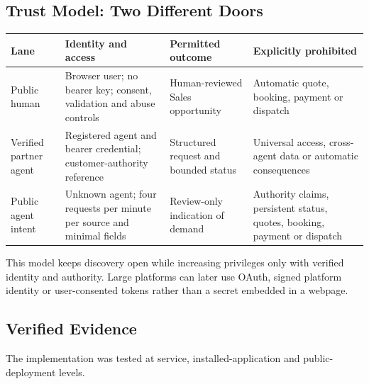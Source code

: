 \subsection{Trust Model: Two Different Doors}

\begin{center}
\begin{tabularx}{\textwidth}{>{\raggedright\arraybackslash}X >{\raggedright\arraybackslash}X >{\raggedright\arraybackslash}X >{\raggedright\arraybackslash}X}
\toprule
\textbf{Lane} & \textbf{Identity and access} & \textbf{Permitted outcome} & \textbf{Explicitly prohibited} \\
\midrule
Public human & Browser user; no bearer key; consent, validation and abuse controls & Human-reviewed Sales opportunity & Automatic quote, booking, payment or dispatch \\
Verified partner agent & Registered agent and bearer credential; customer-authority reference & Structured request and bounded status & Universal access, cross-agent data or automatic consequences \\
Public agent intent & Unknown agent; four requests per minute per source and minimal fields & Review-only indication of demand & Authority claims, persistent status, quotes, booking, payment or dispatch \\
\bottomrule
\end{tabularx}
\end{center}

This model keeps discovery open while increasing privileges only with verified identity and authority.  Large platforms can later use OAuth, signed platform identity or user-consented tokens rather than a secret embedded in a webpage.

\subsection{Verified Evidence}

The implementation was tested at service, installed-application and public-deployment levels.

